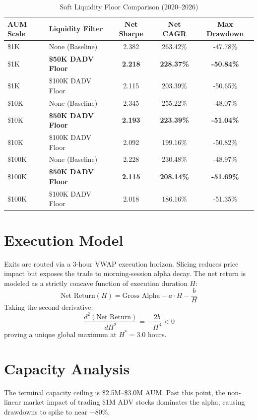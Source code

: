 \documentclass[11pt,a4paper]{article}
\begin{document}
\begin{table}[htbp]
\centering
\caption{Soft Liquidity Floor Comparison (2020--2026)}
\begin{tabular}{llccc}
\toprule
AUM Scale & Liquidity Filter & Net Sharpe & Net CAGR & Max Drawdown \\
\midrule
\$1K & None (Baseline) & 2.382 & 263.42\% & -47.78\% \\
\$1K & \textbf{\$50K DADV Floor} & \textbf{2.218} & \textbf{228.37\%} & \textbf{-50.84\%} \\
\$1K & \$100K DADV Floor & 2.115 & 203.39\% & -50.65\% \\
\midrule
\$10K & None (Baseline) & 2.345 & 255.22\% & -48.07\% \\
\$10K & \textbf{\$50K DADV Floor} & \textbf{2.193} & \textbf{223.39\%} & \textbf{-51.04\%} \\
\$10K & \$100K DADV Floor & 2.092 & 199.16\% & -50.82\% \\
\midrule
\$100K & None (Baseline) & 2.228 & 230.48\% & -48.97\% \\
\$100K & \textbf{\$50K DADV Floor} & \textbf{2.115} & \textbf{208.14\%} & \textbf{-51.69\%} \\
\$100K & \$100K DADV Floor & 2.018 & 186.16\% & -51.35\% \\
\bottomrule
\end{tabular}
\end{table}

\section{Execution Model}
Exits are routed via a 3-hour VWAP execution horizon. Slicing reduces price impact but exposes the trade to morning-session alpha decay. The net return is modeled as a strictly concave function of execution duration $H$:
\begin{equation}
\text{Net Return}(H) = \text{Gross Alpha} - a \cdot H - \frac{b}{H}
\end{equation}
Taking the second derivative:
\begin{equation}
\frac{d^2(\text{Net Return})}{dH^2} = -\frac{2b}{H^3} < 0
\end{equation}
proving a unique global maximum at $H^* = 3.0$ hours.

\section{Capacity Analysis}
The terminal capacity ceiling is \$2.5M--\$3.0M AUM. Past this point, the non-linear market impact of trading \$1M ADV stocks dominates the alpha, causing drawdowns to spike to near $-80\%$.
\end{document}
